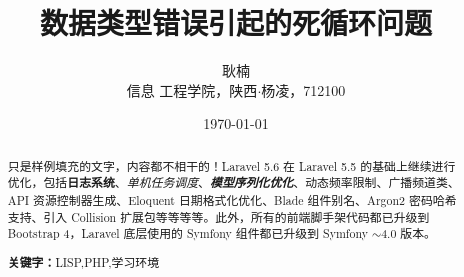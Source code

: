 \documentclass{nwafucoursepaper}
\title{\bfseries\sffamily 数据类型错误引起的死循环问题}
\author{\zihao{4} \fangsong 耿楠\\\small \songti 信息
  工程学院，陕西$\cdot$杨凌，712100}
\date{\today}
\begin{document}

\maketitle
\thispagestyle{empty}

\begin{abstract}
\noindent 只是样例填充的文字，内容都不相干的！Laravel 5.6 在 Laravel 5.5 的基础上继续进行优化，包括\textbf{日志系统}、\textit{单机任务调度}、\textbf{\textit{模型序列化优化}}、动态频率限制、广播频道类、API 资源控制器生成、Eloquent 日期格式化优化、Blade 组件别名、Argon2 密码哈希支持、引入 Collision 扩展包等等等等。此外，所有的前端脚手架代码都已升级到 Bootstrap 4，Laravel 底层使用的 Symfony 组件都已升级到 Symfony $\sim$4.0 版本。

\vspace{2ex}
\noindent \textbf{关键字：}LISP,\hspace{.5em}PHP,\hspace{.5em}学习环境
\end{abstract}
\end{document}
